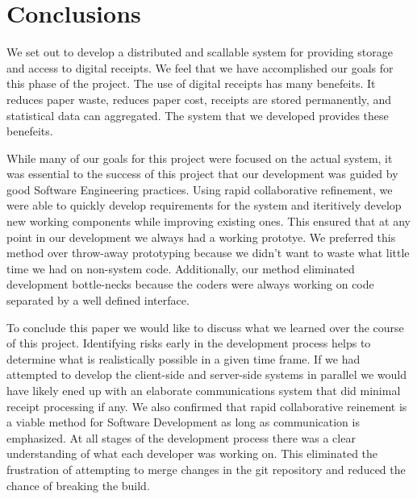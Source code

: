 \section{Conclusions}

We set out to develop a distributed and scallable system for providing storage and access to digital receipts.  We feel that we have accomplished our goals for this phase of the project.  The use of digital receipts has many benefeits.  It reduces paper waste, reduces paper cost, receipts are stored permanently, and statistical data can aggregated.  The system that we developed provides these benefeits.

While many of our goals for this project were focused on the actual system, it was essential to the success of this project that our development was guided by good Software Engineering practices.  Using rapid collaborative refinement, we were able to quickly develop requirements for the system and iteritively develop new working components while improving existing ones.  This ensured that at any point in our development we always had a working prototye.  We preferred this method over throw-away prototyping because we didn't want to waste what little time we had on non-system code.  Additionally, our method eliminated development bottle-necks because the coders were always working on code separated by a well defined interface.

To conclude this paper we would like to discuss what we learned over the course of this project.  Identifying risks early in the development process helps to determine what is realistically possible in a given time frame.  If we had attempted to develop the client-side and server-side systems in parallel we would have likely ened up with an elaborate communications system that did minimal receipt processing if any.  We also confirmed that rapid collaborative reinement is a viable method for Software Development as long as communication is emphasized.  At all stages of the development process there was a clear understanding of what each developer was working on.  This eliminated the frustration of attempting to merge changes in the git repository and reduced the chance of breaking the build.


